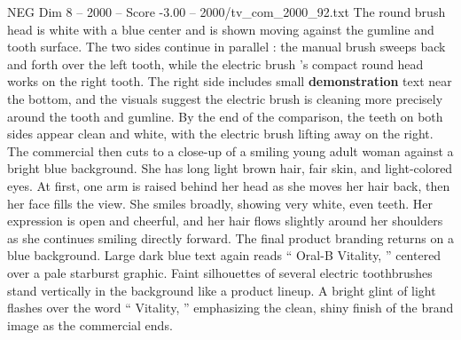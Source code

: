\begin{textsample}{NEG Dim 8 – 2000 – Score -3.00 – 2000/tv\_com\_2000\_92.txt}
The round brush head is white with a blue center and is shown moving against the gumline and tooth surface.
The two sides continue in parallel : the manual brush sweeps back and forth over the left tooth, while the electric brush ’s compact round head works on the right tooth.
The right side includes small \textbf{demonstration} text near the bottom, and the visuals suggest the electric brush is cleaning more precisely around the tooth and gumline.
By the end of the comparison, the teeth on both sides appear clean and white, with the electric brush lifting away on the right.
The commercial then cuts to a close-up of a smiling young adult woman against a bright blue background.
She has long light brown hair, fair skin, and light-colored eyes.
At first, one arm is raised behind her head as she moves her hair back, then her face fills the view.
She smiles broadly, showing very white, even teeth.
Her expression is open and cheerful, and her hair flows slightly around her shoulders as she continues smiling directly forward.
The final product branding returns on a blue background.
Large dark blue text again reads “ Oral-B Vitality, ” centered over a pale starburst graphic.
Faint silhouettes of several electric toothbrushes stand vertically in the background like a product lineup.
A bright glint of light flashes over the word “ Vitality, ” emphasizing the clean, shiny finish of the brand image as the commercial ends.

\end{textsample}
